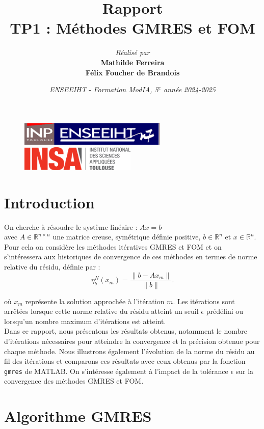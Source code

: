 \documentclass[12pt,a4paper]{article}
\title{\vspace{4cm}
        Rapport \\
        \vspace{1cm} \textbf{TP1 : Méthodes GMRES et FOM} \\ 
        \vspace{4cm} 
}
\author{\textit{Réalisé par} \vspace{0.5cm}\\
         \textbf{Mathilde Ferreira} \\
        \textbf{Félix Foucher de Brandois}
}
\date{\vfill
        \textit{ENSEEIHT} - 
        \textit{Formation ModIA, 5$^{e}$ année}
        \hfill
        \textit{2024-2025} \\
        \vspace{1cm}
}
\begin{document}
\begin{figure}[t]
    \centering
    \includegraphics[width=7cm]{src/inp_n7.png}
    \hfill
    \includegraphics[width=5.5cm]{src/insa_toulouse.png}
\end{figure}


\maketitle
\thispagestyle{empty}

\newpage


\section{Introduction}
\noindent On cherche à résoudre le système linéaire : $Ax = b$ \\
avec $A \in \mathbb{R}^{n \times n}$ une matrice creuse, symétrique définie positive, $b \in \mathbb{R}^{n}$ et $x \in \mathbb{R}^{n}$. \\

Pour cela on considère les méthodes itératives GMRES et FOM et on s’intéressera aux historiques de convergence de ces méthodes en termes de norme relative du résidu, définie par :
$$
\eta_b^N(x_m) = \frac{\|b - Ax_m\|}{\|b\|}.
$$

où $x_m$ représente la solution approchée à l'itération $m$.
Les itérations sont arrêtées lorsque cette norme relative du résidu atteint un seuil $\epsilon$ prédéfini ou lorsqu'un nombre maximum d'itérations est atteint. \\

Dans ce rapport, nous présentons les résultats obtenus, notamment le nombre d'itérations nécessaires pour atteindre la convergence et la précision obtenue pour chaque méthode.
Nous illustrons également l'évolution de la norme du résidu au fil des itérations et comparons ces résultats avec ceux obtenus par la fonction \texttt{gmres} de MATLAB.
On s'intéresse également à l'impact de la tolérance $\epsilon$ sur la convergence des méthodes GMRES et FOM.


\section{Algorithme GMRES}
\end{document}
